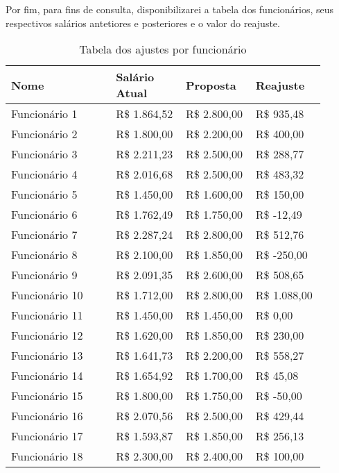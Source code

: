 \documentclass[a4paper, 12pt]{CSSullivanBusinessReport}
\begin{document}
\begin{fullwidth}
Por fim, para fins de consulta, disponibilizarei a tabela dos funcionários, seus respectivos salários antetiores e posteriores e o valor do reajuste.



\begin{longtable}{|L{0.3\linewidth}|R{0.2\linewidth}|R{0.2\linewidth}|R{0.2\linewidth}|}
\caption{Tabela dos ajustes por funcionário}
\hline
\textbf{Nome} & \textbf{Salário Atual} & \textbf{Proposta} & \textbf{Reajuste}\\
\hline
\endhead
  Funcionário 1 & R\$ 1.864,52 & R\$ 2.800,00 & R\$  935,48 \\ 
  Funcionário 2 & R\$ 1.800,00 & R\$ 2.200,00 & R\$  400,00 \\ 
  Funcionário 3 & R\$ 2.211,23 & R\$ 2.500,00 & R\$  288,77 \\ 
  Funcionário 4 & R\$ 2.016,68 & R\$ 2.500,00 & R\$  483,32 \\ 
  Funcionário 5 & R\$ 1.450,00 & R\$ 1.600,00 & R\$  150,00 \\ 
  Funcionário 6 & R\$ 1.762,49 & R\$ 1.750,00 & \textcolor{slightlyred}{R\$  -12,49} \\ 
  Funcionário 7 & R\$ 2.287,24 & R\$ 2.800,00 & R\$  512,76 \\ 
  Funcionário 8 & R\$ 2.100,00 & R\$ 1.850,00 & \textcolor{slightlyred}{R\$ -250,00} \\ 
  Funcionário 9 & R\$ 2.091,35 & R\$ 2.600,00 & R\$  508,65 \\ 
  Funcionário 10 & R\$ 1.712,00 & R\$ 2.800,00 & R\$ 1.088,00 \\ 
  Funcionário 11 & R\$ 1.450,00 & R\$ 1.450,00 & R\$    0,00 \\ 
  Funcionário 12 & R\$ 1.620,00 & R\$ 1.850,00 & R\$  230,00 \\ 
  Funcionário 13 & R\$ 1.641,73 & R\$ 2.200,00 & R\$  558,27 \\ 
  Funcionário 14 & R\$ 1.654,92 & R\$ 1.700,00 & R\$   45,08 \\ 
  Funcionário 15 & R\$ 1.800,00 & R\$ 1.750,00 & \textcolor{slightlyred}{R\$ -50,00} \\ 
  Funcionário 16 & R\$ 2.070,56 & R\$ 2.500,00 & R\$  429,44 \\ 
  Funcionário 17 & R\$ 1.593,87 & R\$ 1.850,00 & R\$  256,13 \\ 
  Funcionário 18 & R\$ 2.300,00 & R\$ 2.400,00 & R\$  100,00 \\ 

\end{longtable}
\end{fullwidth}
\end{document}
